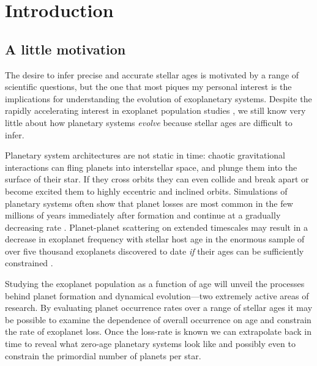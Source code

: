 \chapter{Introduction}
\section{A little motivation}

The desire to infer precise and accurate stellar ages is motivated by a range
of scientific questions, but the one that most piques my personal interest is
the implications for understanding the evolution of exoplanetary systems.
Despite the rapidly accelerating interest in exoplanet population studies
\citep[e.g.][]{petigura, dressing, foreman-mackey, burke}, we still know very
little about how planetary systems {\it evolve} because stellar ages are
difficult to infer.

Planetary system architectures are not static in time: chaotic gravitational
interactions can fling planets into interstellar space, and plunge them into
the surface of their star.
If they cross orbits they can even collide and break apart or become excited
them to highly eccentric and inclined orbits.
Simulations of planetary systems often show that planet losses are most common
in the few millions of years immediately after formation and continue at a
gradually decreasing rate \citep[e.g.][]{zhou, smith, funk, Pu2015}.
Planet-planet scattering on extended timescales may result in a decrease in
exoplanet frequency with stellar host age in the enormous sample of over five
thousand exoplanets discovered to date {\it if} their ages can be sufficiently
constrained \citep{veras}.

Studying the exoplanet population as a function of age will unveil the
processes behind planet formation and dynamical evolution---two extremely
active areas of research.
By evaluating planet occurrence rates over a range of stellar ages it may be
possible to examine the dependence of overall occurrence on age and constrain
the rate of exoplanet loss.
Once the loss-rate is known we can extrapolate back in time to reveal what
zero-age planetary systems look like and possibly even to constrain the
primordial number of planets per star.

